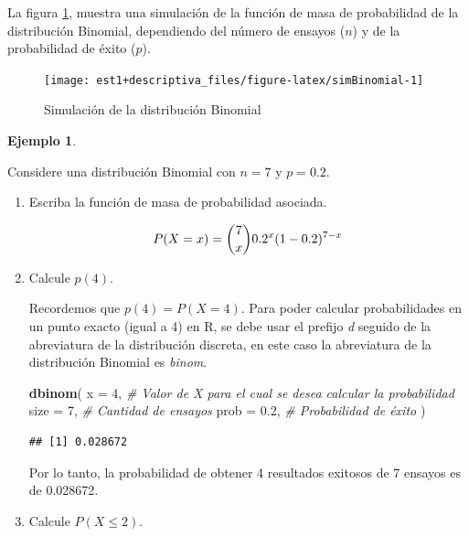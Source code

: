 \documentclass[
  11pt,
]{book}
\newenvironment{Shaded}{\begin{snugshade}}{\end{snugshade}}
\newcommand{\AttributeTok}[1]{\textcolor[rgb]{0.13,0.29,0.53}{#1}}
\newcommand{\CommentTok}[1]{\textcolor[rgb]{0.56,0.35,0.01}{\textit{#1}}}
\newcommand{\DecValTok}[1]{\textcolor[rgb]{0.00,0.00,0.81}{#1}}
\newcommand{\FloatTok}[1]{\textcolor[rgb]{0.00,0.00,0.81}{#1}}
\newcommand{\FunctionTok}[1]{\textcolor[rgb]{0.13,0.29,0.53}{\textbf{#1}}}
\newcommand{\NormalTok}[1]{#1}
\theoremstyle{definition}
\theoremstyle{definition}
\newtheorem{example}{Ejemplo}[chapter]
\theoremstyle{definition}
\theoremstyle{definition}
\theoremstyle{remark}
\begin{document}
La figura \ref{fig:simBinomial}, muestra una simulación de la función de masa de probabilidad de la distribución Binomial, dependiendo del número de ensayos (\(n\)) y de la probabilidad de éxito (\(p\)).

\begin{figure}

{\centering \texttt{[image: est1+descriptiva\_files/figure-latex/simBinomial-1]} 

}

\caption{Simulación de la distribución Binomial}\label{fig:simBinomial}
\end{figure}

\begin{example}
\protect\hypertarget{exm:ejcomandosbin}{}\label{exm:ejcomandosbin}

Considere una distribución Binomial con \(n = 7\) y \(p = 0.2\).

\begin{enumerate}
\def\labelenumi{\alph{enumi}.}
\item
  Escriba la función de masa de probabilidad asociada.

  \begin{equation}
  \notag
  P(X=x) = \binom{7}{x}0.2^x(1-0.2)^{7-x}
  \end{equation}
\item
  Calcule \(p(4)\).

  Recordemos que \(p(4) = P(X = 4)\). Para poder calcular probabilidades en un punto exacto (igual a 4) en R, se debe usar el prefijo \emph{d} seguido de la abreviatura de la distribución discreta, en este caso la abreviatura de la distribución Binomial es \emph{binom}.

\begin{Shaded}
\begin{Highlighting}[]
\FunctionTok{dbinom}\NormalTok{(}
  \AttributeTok{x =} \DecValTok{4}\NormalTok{, }\CommentTok{\# Valor de X para el cual se desea calcular la probabilidad}
  \AttributeTok{size =} \DecValTok{7}\NormalTok{, }\CommentTok{\# Cantidad de ensayos}
  \AttributeTok{prob =} \FloatTok{0.2}\NormalTok{, }\CommentTok{\# Probabilidad de éxito}
\NormalTok{)}
\end{Highlighting}
\end{Shaded}

\begin{verbatim}
## [1] 0.028672
\end{verbatim}

  Por lo tanto, la probabilidad de obtener 4 resultados exitosos de 7 ensayos es de 0.028672.
\item
  Calcule \(P(X\leq 2)\).


\end{enumerate}
\end{example}
\end{document}
